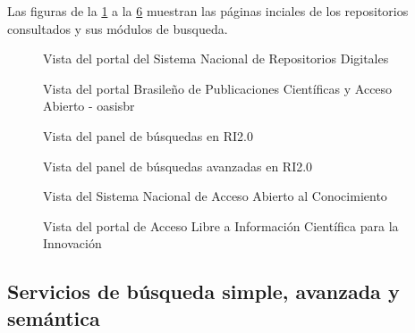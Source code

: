 Las figuras de la \ref{snrd-1} a la \ref{alicia-1} muestran las p\'aginas inciales de los repositorios consultados y sus m\'odulos de busqueda.

\begin{figure}[!ht]
	\centering
    \caption{Vista del portal del Sistema Nacional de Repositorios Digitales} %
    \label{snrd-1}
\end{figure}

\begin{figure}[!ht]
	\centering
    \caption{Vista del portal Brasileño de Publicaciones Cient\'ificas y Acceso Abierto - oasisbr} %
    \label{oasisbr-1}
\end{figure}

\begin{figure}[!ht]
	\centering
    \caption{Vista del panel de b\'usquedas en RI2.0} %
    \label{ri2.0-2}
\end{figure}

\begin{figure}[!ht]
	\centering
    \caption{Vista del panel de b\'usquedas avanzadas en RI2.0} %
    \label{ri2.0-3}
\end{figure}

\begin{figure}[!ht]
	\centering
    \caption{Vista del Sistema Nacional de Acceso Abierto al Conocimiento} %
    \label{snaac-1}
\end{figure}

\begin{figure}[!ht]
	\centering
    \caption{Vista del portal de Acceso Libre a Informaci\'on Cient\'ifica para la Innovaci\'on} %
    \label{alicia-1}
\end{figure}

\subsection{Servicios de b\'usqueda simple, avanzada y sem\'antica}

